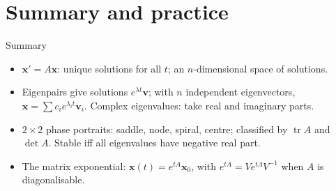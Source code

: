 \documentclass[10pt]{wosm-slides}
\newcommand{\vx}{\mathbf{x}}
\DeclareRobustCommand{\vv}{\mathbf{v}}
\begin{document}
\section{Summary and practice}

\begin{frame}{Summary}
  \begin{itemize}
    \item $\vx' = A\vx$: unique solutions for all $t$; an $n$-dimensional space of solutions.
    \item Eigenpairs give solutions $e^{\lambda t}\vv$; with $n$ independent eigenvectors,
      $\vx = \sum c_i e^{\lambda_i t}\vv_i$. Complex eigenvalues: take real and imaginary parts.
    \item $2 \times 2$ phase portraits: saddle, node, spiral, centre; classified by $\operatorname{tr} A$ and
      $\det A$. Stable iff all eigenvalues have negative real part.
    \item The matrix exponential: $\vx(t) = e^{tA}\vx_0$, with $e^{tA} = V e^{t\Lambda} V^{-1}$ when $A$ is
      diagonalisable.
  \end{itemize}
\end{frame}
\end{document}

